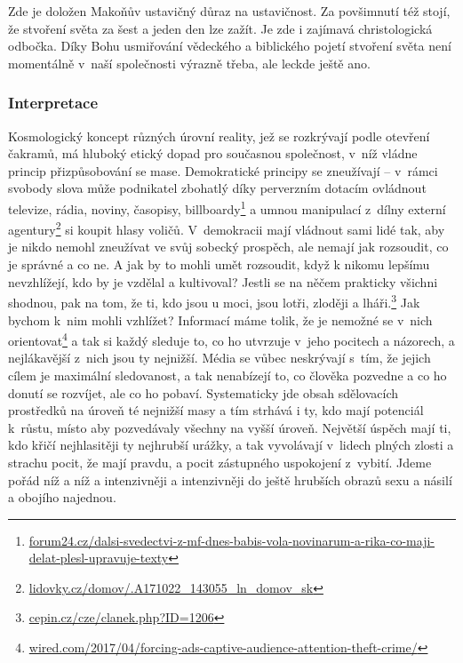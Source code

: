 \begin{enumerate}
{Zde je doložen Makoňův ustavičný důraz na ustavičnost. Za povšimnutí též stojí,
že stvoření světa za šest a jeden den lze zažít. Je zde i zajímavá
christologická odbočka. Díky Bohu usmiřování vědeckého a biblického pojetí
stvoření světa není momentálně v~naší společnosti výrazně třeba, ale leckde
ještě ano.\cite{carlin2017cultures}

}

\end{enumerate}

\subsubsection*{Interpretace}

Kosmologický koncept různých úrovní reality, jež se rozkrývají podle otevření
čakramů, má hluboký etický dopad pro současnou společnost, v~níž vládne princip
přizpůsobování se mase. Demokratické principy se zneužívají -- v~rámci svobody
slova může podnikatel zbohatlý díky perverzním dotacím ovládnout televize,
rádia, noviny, časopisy,
billboardy\footnote{\href{https://www.forum24.cz/dalsi-svedectvi-z-mf-dnes-babis-vola-novinarum-a-rika-co-maji-delat-plesl-upravuje-texty/}{forum24.cz/dalsi-svedectvi-z-mf-dnes-babis-vola-novinarum-a-rika-co-maji-delat-plesl-upravuje-texty}}
a umnou manipulací z~dílny externí
agentury\footnote{\href{https://www.lidovky.cz/domov/kdo-je-babisem-polibeny-genius-exnovinar-a-hvezda-marketingu-marek-prchal.A171022\_143055\_ln\_domov\_sk}{lidovky.cz/domov/.A171022\_143055\_ln\_domov\_sk}}
si koupit hlasy voličů. V~demokracii mají vládnout sami lidé tak, aby je nikdo
nemohl zneužívat ve svůj sobecký prospěch, ale nemají jak rozsoudit, co je
správné a co ne. A jak by to mohli umět rozsoudit, když k nikomu lepšímu
nevzhlížejí, kdo by je vzdělal a kultivoval? Jestli se na něčem prakticky
všichni shodnou, pak na tom, že ti, kdo jsou u moci, jsou lotři, zloději a
lháři.\footnote{\href{http://cepin.cz/cze/clanek.php?ID=1206}{cepin.cz/cze/clanek.php?ID=1206}}
Jak bychom k~nim mohli vzhlížet? Informací máme tolik, že je nemožné se v~nich
orientovat\footnote{\href{https://www.wired.com/2017/04/forcing-ads-captive-audience-attention-theft-crime/}{wired.com/2017/04/forcing-ads-captive-audience-attention-theft-crime/}} a tak si každý sleduje to, co ho utvrzuje v~jeho pocitech a
názorech, a nejlákavější z~nich jsou ty nejnižší. Média se vůbec neskrývají
s~tím, že jejich cílem je maximální sledovanost, a tak nenabízejí to, co člověka
pozvedne a co ho donutí se rozvíjet, ale co ho pobaví.\cite{achtenhagen2014challenges} Systematicky jde obsah
sdělovacích prostředků na úroveň té nejnižší masy a tím strhává i ty, kdo mají
potenciál k~růstu, místo aby pozvedávaly všechny na vyšší úroveň. Největší
úspěch mají ti, kdo křičí nejhlasitěji ty nejhrubší urážky, a tak vyvolávají
v~lidech plných zlosti a strachu pocit, že mají pravdu, a pocit zástupného
uspokojení z~vybití. Jdeme pořád níž a níž a intenzivněji a intenzivněji do
ještě hrubších obrazů sexu a násilí a obojího najednou.

